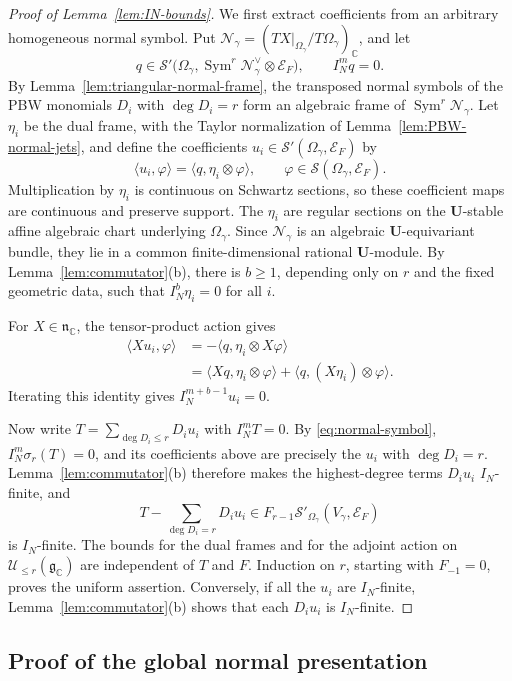 \documentclass[a4paper,12pt]{amsart}
\numberwithin{equation}{section}
\theoremstyle{definition}
\theoremstyle{remark}
\newcommand{\U}{\mathbf U}
\newcommand{\C}{\mathbb C}
\newcommand{\fg}{\mathfrak g}
\newcommand{\fn}{\mathfrak n}
\newcommand{\IN}{I_N}
\newcommand{\mcU}{\mathcal U}
\newcommand{\mcS}{\mathcal S}
\newcommand{\mcE}{\mathcal E}
\newcommand{\Sym}{\operatorname{Sym}}
\begin{document}
\begin{proof}[Proof of Lemma~\ref{lem:IN-bounds}]
We first extract coefficients from an arbitrary homogeneous normal symbol. Put $\mathcal N_\gamma=(TX|_{\Omega_\gamma}/T\Omega_\gamma)_\C$, and let
\[
 q\in\mcS'\bigl(\Omega_\gamma,\Sym^r\mathcal N_\gamma^\vee\otimes\mcE_F\bigr),\qquad \IN^mq=0.
\]
By Lemma~\ref{lem:triangular-normal-frame}, the transposed normal symbols of the PBW monomials $D_i$ with $\deg D_i=r$ form an algebraic frame of $\Sym^r\mathcal N_\gamma$. Let $\eta_i$ be the dual frame, with the Taylor normalization of Lemma~\ref{lem:PBW-normal-jets}, and define the coefficients $u_i\in\mcS'(\Omega_\gamma,\mcE_F)$ by
\[
 \langle u_i,\varphi\rangle
 =\langle q,\eta_i\otimes\varphi\rangle,
 \qquad\varphi\in\mcS(\Omega_\gamma,\mcE_F).
\]
Multiplication by $\eta_i$ is continuous on Schwartz sections, so these coefficient maps are continuous and preserve support. The $\eta_i$ are regular sections on the $\U$-stable affine algebraic chart underlying $\Omega_\gamma$. Since $\mathcal N_\gamma$ is an algebraic $\U$-equivariant bundle, they lie in a common finite-dimensional rational $\U$-module. By Lemma~\ref{lem:commutator}(b), there is $b\ge1$, depending only on $r$ and the fixed geometric data, such that $\IN^b\eta_i=0$ for all $i$.

For $X\in\fn_\C$, the tensor-product action gives
\[
\begin{aligned}
 \langle Xu_i,\varphi\rangle
 &=-\langle q,\eta_i\otimes X\varphi\rangle\\
 &=\langle Xq,\eta_i\otimes\varphi\rangle
   +\langle q,(X\eta_i)\otimes\varphi\rangle.
\end{aligned}
\]
Iterating this identity gives $\IN^{m+b-1}u_i=0$.

Now write $T=\sum_{\deg D_i\le r}D_iu_i$ with $\IN^mT=0$. By \eqref{eq:normal-symbol}, $\IN^m\sigma_r(T)=0$, and its coefficients above are precisely the $u_i$ with $\deg D_i=r$. Lemma~\ref{lem:commutator}(b) therefore makes the highest-degree terms $D_iu_i$ $\IN$-finite, and
\[
 T-\sum_{\deg D_i=r}D_iu_i
 \in F_{r-1}\mcS'_{\Omega_\gamma}(V_\gamma,\mcE_F)
\]
is $\IN$-finite. The bounds for the dual frames and for the adjoint action on $\mcU_{\le r}(\fg_\C)$ are independent of $T$ and $F$. Induction on $r$, starting with $F_{-1}=0$, proves the uniform assertion. Conversely, if all the $u_i$ are $\IN$-finite, Lemma~\ref{lem:commutator}(b) shows that each $D_iu_i$ is $\IN$-finite.
\end{proof}

\subsection{Proof of the global normal presentation}\label{ssec:global-presentation}
\end{document}
